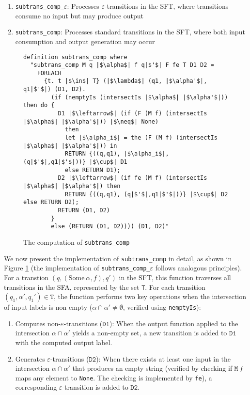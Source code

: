 \documentclass[a4paper,UKenglish,cleveref, autoref, thm-restate]{lipics-v2021}
\begin{document}
\begin{enumerate}
  \item \texttt{subtrans\_comp\_$\varepsilon$}: Processes $\varepsilon$-transitions in the SFT, where transitions consume no input but may produce output
  \item \texttt{subtrans\_comp}: Processes standard transitions in the SFT, where both input consumption and output generation may occur
\end{enumerate}




\begin{figure}[hbt!]
	\begin{lstlisting}
definition subtrans_comp where
  "subtrans_comp M q |$\alpha$| f q|$'$| F fe T D1 D2 =
    FOREACH
      {t. t |$\in$| T} (|$\lambda$| (q1, |$\alpha'$|, q1|$'$|) (D1, D2).
        (if (nemptyIs (intersectIs |$\alpha$| |$\alpha'$|)) then do {
          D1 |$\leftarrow$| (if (F (M f) (intersectIs |$\alpha$| |$\alpha'$|)) |$\neq$| None) 
            then  
            let |$\alpha_i$| = the (F (M f) (intersectIs |$\alpha$| |$\alpha'$|)) in
            RETURN {((q,q1), |$\alpha_i$|, (q|$'$|,q1|$'$|))} |$\cup$| D1
            else RETURN D1);
          D2 |$\leftarrow$| (if fe (M f) (intersectIs |$\alpha$| |$\alpha'$|) then 
            RETURN {((q,q1), (q|$'$|,q1|$'$|))} |$\cup$| D2 else RETURN D2);
          RETURN (D1, D2)
        }
        else (RETURN (D1, D2)))) (D1, D2)"
    \end{lstlisting}
    \caption{The computation of \texttt{subtrans\_comp}}
    \label{fig-def-subtrans_comp}
    \end{figure}


    We now present the implementation of \texttt{subtrans\_comp} in detail, as shown in Figure \ref{fig-def-subtrans_comp} (the implementation of \texttt{subtrans\_comp\_$\varepsilon$} follows analogous principles). For a transtion $(q, (\text{Some}~\alpha, f), q')$ in the SFT, this function traverses all transitions in the SFA, represented by the set \texttt{T}. For each transition $(q_1, \alpha', q_1')\in \texttt{T}$, the function performs two key operations when the intersection of input labels is non-empty ($\alpha \cap \alpha' \neq \emptyset$, verified using \texttt{nemptyIs}):

    \begin{enumerate}
      \item Computes non-$\varepsilon$-transitions ($\texttt{D1}$): When the output function applied to the intersection $\alpha \cap \alpha'$ yields a non-empty set, a new transition is added to $\texttt{D1}$ with the computed output label.
      \item Generates $\varepsilon$-transitions ($\texttt{D2}$): When there exists at least one input in the intersection $\alpha \cap \alpha'$ that produces an empty string (verified by checking if $\texttt{M}~f$ maps any element to \texttt{None}. The checking is implemented by \texttt{fe}), a corresponding $\varepsilon$-transition is added to $\texttt{D2}$.
    \end{enumerate}
    
\end{document}
